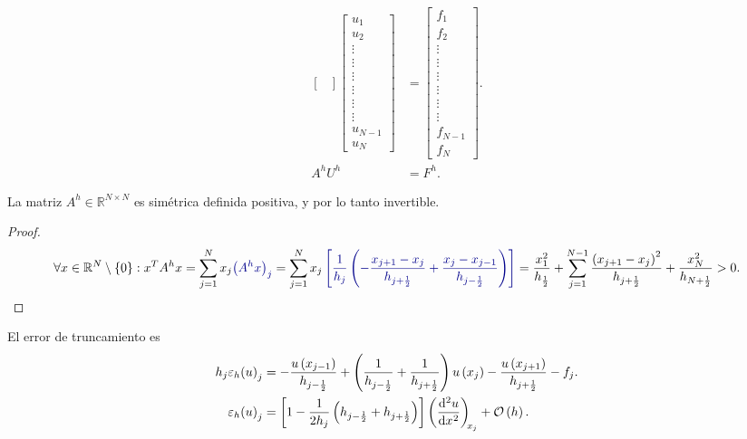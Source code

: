 \begin{align*}
\begin{bmatrix}
	\end{bmatrix}
	\begin{bmatrix}
		u_{1}   \\
		u_{2}   \\
		\vdots  \\
		\vdots  \\
		\vdots  \\
		\vdots  \\
		\vdots  \\
		\vdots  \\
		u_{N-1} \\
		u_{N}
	\end{bmatrix} & =
	\begin{bmatrix}
		f_{1}   \\
		f_{2}   \\
		\vdots  \\
		\vdots  \\
		\vdots  \\
		\vdots  \\
		\vdots  \\
		\vdots  \\
		f_{N-1} \\
		f_{N}
	\end{bmatrix}.      \\
	A^{h}U^{h}      & =
	F^{h}.
\end{align*}



\begin{theorem}
	La matriz $A^{h}\in\mathbb{R}^{N\times N}$ es simétrica definida
	positiva, y por lo tanto invertible.
\end{theorem}

\begin{proof}
	\begin{equation*}
		\forall x\in\mathbb{R}^{N}\setminus\left\{0\right\}:
		x^{T}A^{h}x=
		\sum_{j=1}^{N}
		x_{j}
		\mathcolor{DarkBlue}{
			{\big(A^{h}x\big)}_{j}
		}=
		\sum_{j=1}^{N}
		x_{j}
		\mathcolor{DarkBlue}{
			\left[
				\frac{1}{h_{j}}
				\left(
				-\frac{x_{j+1}-x_{j}}{h_{j+\frac{1}{2}}}+
				\frac{x_{j}-x_{j-1}}{h_{j-\frac{1}{2}}}
				\right)
				\right]
		}=
		\frac{x^{2}_{1}}{h_{\frac{1}{2}}}+
		\sum_{j=1}^{N-1}
		\frac{{\left(x_{j+1}-x_{j}\right)}^{2}}{h_{j+\frac{1}{2}}}+
		\frac{x^{2}_{N}}{h_{N+\frac{1}{2}}}
		>0.
	\end{equation*}
\end{proof}

El error de truncamiento es
\begin{align*}
	h_{j}
	\varepsilon_{h}
	{\left(u\right)}_{j} & =
	-\frac{u\left(x_{j-1}\right)}{h_{j-\frac{1}{2}}}+
	\left(
	\frac{1}{h_{j-\frac{1}{2}}}+\frac{1}{h_{j+\frac{1}{2}}}
	\right)
	u\left(x_{j}\right)-
	\frac{u\left(x_{j+1}\right)}{h_{j+\frac{1}{2}}}-
	f_{j}.                   \\
	\varepsilon_{h}
	{\left(u\right)}_{j} & =
	\left[
		1-
		\frac{1}{2h_{j}}
		\left(
		h_{j-\frac{1}{2}}+
		h_{j+\frac{1}{2}}
		\right)
		\right]
	\diff[2]{u}{x}[x_{j}]+
	\mathcal{O}\left(h\right).
\end{align*}

